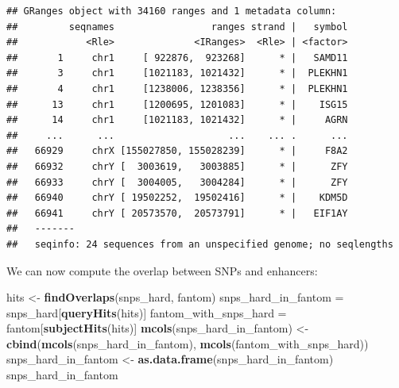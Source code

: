 \documentclass[9pt,a4paper,]{extarticle}
\newenvironment{Shaded}{\begin{snugshade}}{\end{snugshade}}
\newcommand{\KeywordTok}[1]{\textcolor[rgb]{0.13,0.29,0.53}{\textbf{#1}}}
\newcommand{\StringTok}[1]{\textcolor[rgb]{0.31,0.60,0.02}{#1}}
\newcommand{\NormalTok}[1]{#1}
\begin{document}
\begin{verbatim}
## GRanges object with 34160 ranges and 1 metadata column:
##         seqnames                 ranges strand |   symbol
##            <Rle>              <IRanges>  <Rle> | <factor>
##       1     chr1     [ 922876,  923268]      * |   SAMD11
##       3     chr1     [1021183, 1021432]      * |  PLEKHN1
##       4     chr1     [1238006, 1238356]      * |  PLEKHN1
##      13     chr1     [1200695, 1201083]      * |    ISG15
##      14     chr1     [1021183, 1021432]      * |     AGRN
##     ...      ...                    ...    ... .      ...
##   66929     chrX [155027850, 155028239]      * |     F8A2
##   66932     chrY [  3003619,   3003885]      * |      ZFY
##   66933     chrY [  3004005,   3004284]      * |      ZFY
##   66940     chrY [ 19502252,  19502416]      * |    KDM5D
##   66941     chrY [ 20573570,  20573791]      * |   EIF1AY
##   -------
##   seqinfo: 24 sequences from an unspecified genome; no seqlengths
\end{verbatim}

We can now compute the overlap between SNPs and enhancers:

\begin{Shaded}
\begin{Highlighting}[]
\NormalTok{hits <-}\StringTok{ }\KeywordTok{findOverlaps}\NormalTok{(snps_hard, fantom)}
\NormalTok{snps_hard_in_fantom =}\StringTok{ }\NormalTok{snps_hard[}\KeywordTok{queryHits}\NormalTok{(hits)]}
\NormalTok{fantom_with_snps_hard =}\StringTok{ }\NormalTok{fantom[}\KeywordTok{subjectHits}\NormalTok{(hits)]}
\KeywordTok{mcols}\NormalTok{(snps_hard_in_fantom) <-}\StringTok{ }\KeywordTok{cbind}\NormalTok{(}\KeywordTok{mcols}\NormalTok{(snps_hard_in_fantom), }\KeywordTok{mcols}\NormalTok{(fantom_with_snps_hard))}
\NormalTok{snps_hard_in_fantom <-}\StringTok{ }\KeywordTok{as.data.frame}\NormalTok{(snps_hard_in_fantom)}
\NormalTok{snps_hard_in_fantom}
\end{Highlighting}
\end{Shaded}
\end{document}
